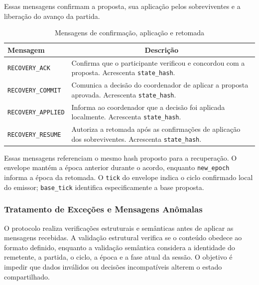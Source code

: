 \documentclass[11pt,a4paper]{article}
\begin{document}
Essas mensagens confirmam a proposta, sua aplicação pelos sobreviventes e a liberação do avanço da partida.

\begin{table}[H]
    \centering
    \caption{Mensagens de confirmação, aplicação e retomada}
    \label{tab:retomada_p2p}
    \begin{tabular}{|p{4.3cm}|p{9.2cm}|}
        \hline
        \textbf{Mensagem} &
        \multicolumn{1}{c|}{\textbf{Descrição}} \\ \hline

        \texttt{RECOVERY\_ACK} &
        Confirma que o participante verificou e concordou com a proposta. Acrescenta \texttt{state\_hash}. \\ \hline

        \texttt{RECOVERY\_COMMIT} &
        Comunica a decisão do coordenador de aplicar a proposta aprovada. Acrescenta \texttt{state\_hash}. \\ \hline

        \texttt{RECOVERY\_APPLIED} &
        Informa ao coordenador que a decisão foi aplicada localmente. Acrescenta \texttt{state\_hash}. \\ \hline

        \texttt{RECOVERY\_RESUME} &
        Autoriza a retomada após as confirmações de aplicação dos sobreviventes. Acrescenta \texttt{state\_hash}. \\ \hline
    \end{tabular}
\end{table}

Essas mensagens referenciam o mesmo hash proposto para a recuperação. O envelope mantém a época anterior durante o acordo, enquanto \texttt{new\_epoch} informa a época da retomada. O \texttt{tick} do envelope indica o ciclo confirmado local do emissor; \texttt{base\_tick} identifica especificamente a base proposta.


\subsubsection{Tratamento de Exceções e Mensagens Anômalas}
\label{sec:excecoes-p2p}

O protocolo realiza verificações estruturais e semânticas antes de aplicar as mensagens recebidas. A validação estrutural verifica se o conteúdo obedece ao formato definido, enquanto a validação semântica considera a identidade do remetente, a partida, o ciclo, a época e a fase atual da sessão. O objetivo é impedir que dados inválidos ou decisões incompatíveis alterem o estado compartilhado.
\end{document}
